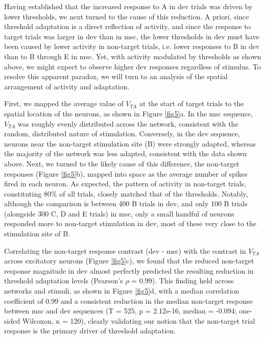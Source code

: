 \documentclass[pdflatex,referee,iicol,sn-basic]{sn-jnl}
\theoremstyle{thmstyleone}%
\theoremstyle{thmstyletwo}%
\theoremstyle{thmstylethree}%
\begin{document}
Having established that the increased response to A in dev trials was driven by lower thresholds, we next turned to the cause of this reduction. A priori, since threshold adaptation is a direct reflection of activity, and since the response to target trials was larger in dev than in msc, the lower thresholds in dev must have been caused by lower activity in non-target trials, i.e. lower responses to B in dev than to B through E in msc. Yet, with activity modulated by thresholds as shown above, we might expect to observe higher dev responses regardless of stimulus. To resolve this apparent paradox, we will turn to an analysis of the spatial arrangement of activity and adaptation.

First, we mapped the average value of $V_{TA}$ at the start of target trials to the spatial location of the neurons, as shown in Figure \ref{fig5}a. In the msc sequence, $V_{TA}$ was roughly evenly distributed across the network, consistent with the random, distributed nature of stimulation. Conversely, in the dev sequence, neurons near the non-target stimulation site (B) were strongly adapted, whereas the majority of the network was less adapted, consistent with the data shown above.
Next, we turned to the likely cause of this difference, the non-target responses (Figure \ref{fig5}b), mapped into space as the average number of spikes fired in each neuron. As expected, the pattern of activity in non-target trials, constituting 80\% of all trials, closely matched that of the thresholds. Notably, although the comparison is between 400 B trials in dev, and only 100 B trials (alongside 300 C, D and E trials) in msc, only a small handful of neurons responded more to non-target stimulation in dev, most of these very close to the stimulation site of B.

Correlating the non-target response contrast (dev - msc) with the contrast in $V_{TA}$ across excitatory neurons (Figure \ref{fig5}c), we found that the reduced non-target response magnitude in dev almost perfectly predicted the resulting reduction in threshold adaptation levels (Pearson's $\rho$ = 0.99).
This finding held across networks and stimuli, as shown in Figure \ref{fig5}d, with a median correlation coefficient of 0.99 and a consistent reduction in the median non-target response between msc and dev sequences (T = 525, p = 2.12e-16, median = -0.094; one-sided Wilcoxon, n = 120), clearly validating our notion that the non-target trial response is the primary driver of threshold adaptation.
\end{document}
